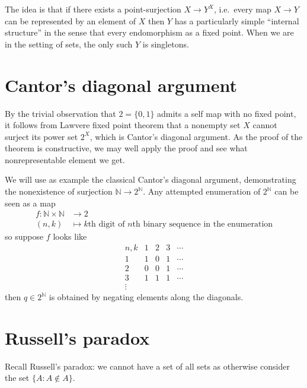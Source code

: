 \documentclass[a4paper]{article}
\newcommand*{\N}{{\mathbb{N}}}
\begin{document}
The idea is that if there exists a point-surjection \(X \to Y^X\), i.e.\ every map \(X \to Y\) can be represented by an element of \(X\) then \(Y\) has a particularly simple ``internal structure'' in the sense that every endomorphism as a fixed point. When we are in the setting of sets, the only such \(Y\) is singletons.

\section{Cantor's diagonal argument}

By the trivial observation that \(2 = \{0, 1\}\) admits a self map with no fixed point, it follows from Lawvere fixed point theorem that a nonempty set \(X\) cannot surject its power set \(2^X\), which is Cantor's diagonal argument. As the proof of the theorem is constructive, we may well apply the proof and see what nonrepresentable element we get.

We will use as example the classical Cantor's diagonal argument, demonstrating the nonexistence of surjection \(\N \to 2^\N\). Any attempted enumeration of \(2^\N\) can be seen as a map
\begin{align*}
  f: \N \times \N &\to 2 \\
  (n, k) &\mapsto \text{\(k\)th digit of \(n\)th binary sequence in the enumeration}
\end{align*}
so suppose \(f\) looks like
\[
  \begin{array}{c|ccccc}
    n, k & 1 & 2 & 3 & \cdots \\ \hline
    1 & 1 & 0 & 1 & \cdots \\
    2 & 0 & 0 & 1 & \cdots \\
    3 & 1 & 1 & 1 & \cdots \\
    \vdots
  \end{array}
\]
then \(q \in 2^\N\) is obtained by negating elements along the diagonals.

\section{Russell's paradox}

Recall Russell's paradox: we cannot have a set of all sets as otherwise consider the set \(\{A: A \notin A\}\).

\end{document}
